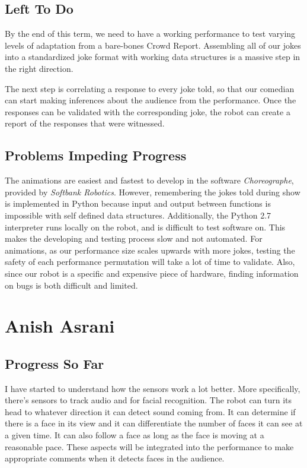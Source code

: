 \documentclass[onecolumn, draftclsnofoot,10pt, compsoc]{IEEEtran}
\begin{document}
\subsection{Left To Do}
By the end of this term, we need to have a working performance to test varying levels of adaptation from a bare-bones Crowd Report. Assembling all of our jokes into a standardized joke format with working data structures is a massive step in the right direction.

The next step is correlating a response to every joke told, so that our comedian can start making inferences about the audience from the performance. Once the responses can be validated with the corresponding joke, the robot can create a report of the responses that were witnessed.

\subsection{Problems Impeding Progress}
The animations are easiest and fastest to develop in the software \textit{Choreographe}, provided by \textit{Softbank Robotics}. However, remembering the jokes told during show is implemented in Python because input and output between functions is impossible with self defined data structures. Additionally, the Python 2.7 interpreter runs locally on the robot, and is difficult to test software on. This makes the developing and testing process slow and not automated.
For animations, as our performance size scales upwards with more jokes, testing the safety of each performance permutation will take a lot of time to validate. Also, since our robot is a specific and expensive piece of hardware, finding information on bugs is both difficult and limited.





\section{Anish Asrani}

\subsection{Progress So Far}
I have started to understand how the sensors work a lot better. More specifically, there's sensors to track audio and for facial recognition. The robot can turn its head to whatever direction it can detect sound coming from. It can determine if there is a face in its view and it can differentiate the number of faces it can see at a given time. It can also follow a face as long as the face is moving at a reasonable pace. These aspects will be integrated into the performance to make appropriate comments when it detects faces in the audience.
\end{document}
